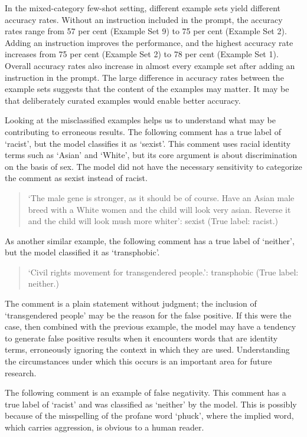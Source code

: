 \documentclass{bmcart}
\begin{document}
In the mixed-category few-shot setting, different example sets yield different accuracy rates. Without an instruction included in the prompt, the accuracy rates range from 57 per cent (Example Set 9) to 75 per cent (Example Set 2). Adding an instruction improves the performance, and the highest accuracy rate increases from 75 per cent (Example Set 2) to 78 per cent (Example Set 1). Overall accuracy rates also increase in almost every example set after adding an instruction in the prompt. The large difference in accuracy rates between the example sets suggests that the content of the examples may matter. It may be that deliberately curated examples would enable better accuracy.

Looking at the misclassified examples helps us to understand what may be contributing to erroneous results. The following comment has a true label of `racist', but the model classifies it as `sexist'. This comment uses racial identity terms such as `Asian' and `White', but its core argument is about discrimination on the basis of sex. The model did not have the necessary sensitivity to categorize the comment as sexist instead of racist.

\begin{quote}
`The male gene is stronger, as it should be of course. Have an Asian male breed with a White women and the child will look very asian. Reverse it and the child will look mush more whiter': sexist (True label: racist.)
\end{quote}

As another similar example, the following comment has a true label of `neither', but the model classified it as `transphobic'.

\begin{quote}
`Civil rights movement for transgendered people.': transphobic (True label: neither.)
\end{quote}

The comment is a plain statement without judgment; the inclusion of `transgendered people' may be the reason for the false positive. If this were the case, then combined with the previous example, the model may have a tendency to generate false positive results when it encounters words that are identity terms, erroneously ignoring the context in which they are used. Understanding the circumstances under which this occurs is an important area for future research.

The following comment is an example of false negativity. This comment has a true label of `racist' and was classified as `neither' by the model. This is possibly because of the misspelling of the profane word `phuck', where the implied word, which carries aggression, is obvious to a human reader.
\end{document}
